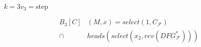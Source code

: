 \begin{minipage}[t]{6cm}
    $k=3$\quad$v_3=\text{step}$
    \begin{graybox}
        \setlength{\abovedisplayskip}{0pt}
        \setlength{\belowdisplayskip}{0pt}
        \vspace{-0.5em}
        \begin{align*}
            B_3[C]&(M,x)=select(1,C_\mathcal{F})\\
                \mathrel\cap{}&heads(select(x_2,rev(DFG_\mathcal{F}^*)))
        \end{align*}
    \end{graybox}
    \vspace{-0.75em}

    \phantom{\large $x=(9,17,22)$}
\end{minipage}
\hfill
